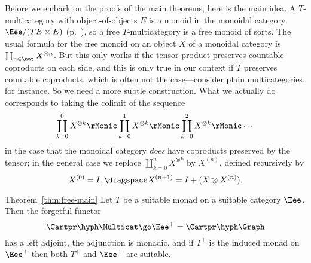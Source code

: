 Before we embark on the proofs of the main theorems, here is the main idea.
A $T$-multicategory with object-of-objects $E$ is a monoid in the monoidal
category $\Eee/(TE \times E)$ (p.~\pageref{p:slice-monoidal}), so a free
$T$-multicategory is a free%
%
%
monoid of sorts.  The usual formula for the
free monoid on an object $X$ of a monoidal category is $\coprod_{n\in\nat}
X^{\otimes n}$.  But this only works if the tensor product preserves
countable coproducts on each side, and this is only true in our context if
$T$ preserves countable coproducts, which is often not the case---consider
plain multicategories, for instance.  So we need a more subtle
construction.  What we actually do corresponds to taking the colimit of the
sequence
\[
\coprod_{k=0}^{0} X^{\otimes k}
\rMonic
\coprod_{k=0}^{1} X^{\otimes k}
\rMonic
\coprod_{k=0}^{2} X^{\otimes k}
\rMonic
\cdots
\]
in the case that the monoidal category \emph{does} have coproducts
preserved by the tensor; in the general case we replace $\coprod_{k=0}^{n}
X^{\otimes k}$ by $X^{(n)}$, defined recursively by
\[
X^{(0)} = I,
\diagspace 
X^{(n+1)} = I + (X \otimes X^{(n)}).
\]

\begin{quotedthm}{Theorem~\ref{thm:free-main}}
Let $T$ be a suitable monad on a suitable category $\Eee$.  Then the
forgetful functor
\[
\Cartpr\hyph\Multicat \go \Eee^+ = \Cartpr\hyph\Graph
\]
has a left adjoint, the adjunction is monadic, and if $T^+$ is the induced
monad on $\Eee^+$ then both $T^+$ and $\Eee^+$ are suitable.
\end{quotedthm}

